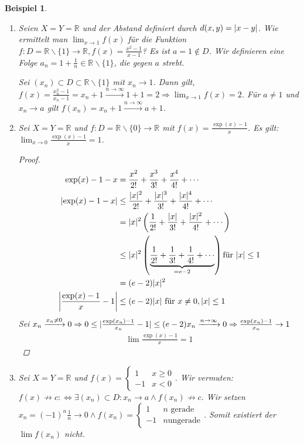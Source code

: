 \documentclass[ngerman,titlepage,twoside, parskip=half*]{scrreprt}
\newcommand*{\R}{\mathbb{R}}
\newcommand*{\perdef}{:\Leftrightarrow}
\theoremstyle{break}
\theoremstyle{nonumberbreak}
\newtheorem{beispiel}{Beispiel}
\newtheorem{proof}{Beweis:}
\DeclarePairedDelimiter{\abs}{\lvert}{\rvert}
\begin{document}
\begin{beispiel}
  \begin{enumerate}[(1)]
  \item Seien $X=Y=\R$ und der Abstand definiert durch $d(x,y)=\abs{x-y}$. Wie
    ermittelt man $\lim_{x\rightarrow 1} f(x)$ für die Funktion $f\colon D=\R
    \backslash \{1\}\rightarrow \R, f(x)=\frac{x^2-1}{x-1}$? Es ist $a=1\notin
    D$. Wir definieren eine Folge $a_n=1+\frac{1}{n} \in \R\backslash
    \{1\}$, die gegen $a$ strebt.

    Sei $(x_n)\subset D \subset \R \backslash \{1\}$ mit $x_n\rightarrow 1$.
    Dann gilt, $f(x)=\frac{x_n^2 -1}{x_n-1}=x_n+1 \xrightarrow{n\rightarrow
    \infty} 1+1=2 \Rightarrow \lim_{x \rightarrow 1} f(x)=2$. Für
    $a\neq 1$ und $x_n\rightarrow a$ gilt $f(x_n)=x_n+1 \xrightarrow{n
    \rightarrow \infty} a+1$.
  \item Sei $X=Y=\R$ und $f\colon D=\R\backslash \{0\}\rightarrow \R$ mit
    $f(x)=\frac{\exp(x)-1}{x}$. Es gilt: $\lim_{x\rightarrow 0}
    \frac{\exp(x)-1}{x}=1$.
    \begin{proof}
      \begin{align*}
	\exp(x)-1-x &= \frac{x^2}{2!}+\frac{x^3}{3!}+\frac{x^4}{4!}+\dotsb\\
	\abs{\exp(x)-1-x} &\leq \frac{\abs{x}^2}{2!} +\frac{\abs{x}^3}{3!}
	   +\frac{\abs{x}^4}{4!}+\dotsb\\
	&= \abs{x}^2\left(\frac{1}{2!} +\frac{\abs{x}}{3!}
	   +\frac{\abs{x}^2}{4!} +\dotsb\right)\\
	&\leq \abs{x}^2\left(\underbrace{\frac{1}{2!} +\frac{1}{3!}
	   +\frac{1}{4!} +\dotsb}_{=e-2}\right) \text{für } \abs{x}\leq 1\\
	&= (e-2)\abs{x}^2\\
	\abs[\bigg]{\frac{\exp(x)-1}{x}-1} &\leq (e-2)\abs{x} \text{ für }
	   x\neq 0, \abs{x}\leq 1
    \end{align*}
    Sei $x_n\xrightarrow{x_n\neq 0} 0 \Rightarrow 0\leq
      \abs{\frac{\exp(x_n)-1}{x_n}-1}\leq (e-2)x_n \xrightarrow{n\rightarrow
      \infty} 0 \Rightarrow \frac{\exp(x_n)-1}{x_n}\rightarrow 1$
    \begin{gather*}\lim \frac{\exp(x)-1}{x}=1\end{gather*}
    \end{proof}
  \item Sei $X=Y=\R$ und $f(x)=\begin{cases}1 & x \geq 0\\-1 &
				 x<0\end{cases}$. Wir vermuten:
    $f(x)\not\rightarrow c \perdef \exists (x_n) \subset D\colon
    x_n\rightarrow a \wedge f(x_n)\not\rightarrow c$. Wir setzen
    $x_n=(-1)^n\frac{1}{n}\rightarrow 0 \wedge f(x_n)=\begin{cases}1 & n
							\text{ gerade}\\-1 & n
							\text{
							  ungerade}\end{cases}$.
    Somit existiert der $\lim f(x_n)$ nicht.
\end{enumerate}
\end{beispiel}
\end{document}
